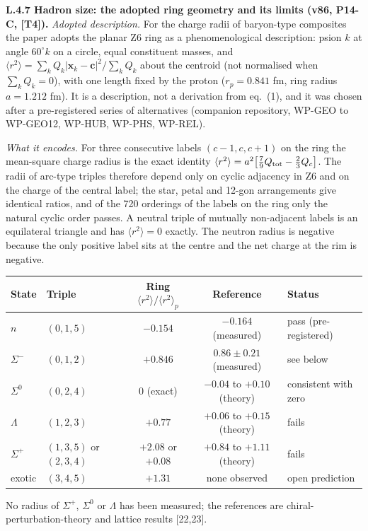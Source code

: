 \documentclass[11pt,letterpaper]{article}
\begin{document}
\noindent \textbf{L.4.7 Hadron size: the adopted ring geometry and its limits (v86, P14-C, [T4]).} \emph{Adopted description.} For the charge radii of baryon-type composites the paper adopts the planar Z6 ring as a phenomenological description: psion $k$ at angle $60^\circ k$ on a circle, equal constituent masses, and $\langle r^2\rangle=\sum_kQ_k|\mathbf{x}_k-\mathbf{c}|^2/\sum_kQ_k$ about the centroid (not normalised when $\sum_kQ_k=0$), with one length fixed by the proton ($r_p=0.841$ fm, ring radius $a=1.212$ fm). It is a description, not a derivation from eq.~(1), and it was chosen after a pre-registered series of alternatives (companion repository, WP-GEO to WP-GEO12, WP-HUB, WP-PHS, WP-REL).

\noindent \emph{What it encodes.} For three consecutive labels $(c-1,c,c+1)$ on the ring the mean-square charge radius is the exact identity $\langle r^2\rangle=a^2\big[\tfrac79Q_{\rm tot}-\tfrac23Q_c\big]$. The radii of arc-type triples therefore depend only on cyclic adjacency in Z6 and on the charge of the central label; the star, petal and 12-gon arrangements give identical ratios, and of the 720 orderings of the labels on the ring only the natural cyclic order passes. A neutral triple of mutually non-adjacent labels is an equilateral triangle and has $\langle r^2\rangle=0$ exactly. The neutron radius is negative because the only positive label sits at the centre and the net charge at the rim is negative.

\begin{center}\small
\begin{tabular}{llccl}
State & Triple & Ring $\langle r^2\rangle/\langle r^2\rangle_p$ & Reference & Status \\ \hline
$n$ & $(0,1,5)$ & $-0.154$ & $-0.164$ (measured) & pass (pre-registered) \\
$\Sigma^-$ & $(0,1,2)$ & $+0.846$ & $0.86\pm0.21$ (measured) & see below \\
$\Sigma^0$ & $(0,2,4)$ & $0$ (exact) & $-0.04$ to $+0.10$ (theory) & consistent with zero \\
$\Lambda$ & $(1,2,3)$ & $+0.77$ & $+0.06$ to $+0.15$ (theory) & fails \\
$\Sigma^+$ & $(1,3,5)$ or $(2,3,4)$ & $+2.08$ or $+0.08$ & $+0.84$ to $+1.11$ (theory) & fails \\
exotic & $(3,4,5)$ & $+1.31$ & none observed & open prediction \\
\end{tabular}
\end{center}
\noindent No radius of $\Sigma^+$, $\Sigma^0$ or $\Lambda$ has been measured; the references are chiral-perturbation-theory and lattice results [22,23].
\end{document}
